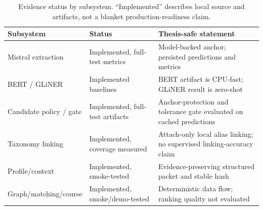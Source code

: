 \begin{table}[H]
\centering
\small
\caption{Evidence status by subsystem. ``Implemented'' describes local source and artifacts, not a blanket production-readiness claim.}
\label{tab:component-status}
\begin{tabularx}{\textwidth}{p{}p{}X}
\toprule
Subsystem & Status & Thesis-safe statement \\
\midrule
Mistral extraction & Implemented, full-test metrics & Model-backed anchor; persisted predictions and metrics \\
BERT / GLiNER & Implemented baselines & BERT artifact is CPU-fast; GLiNER result is zero-shot \\
Candidate policy / gate & Implemented, full-test artifacts & Anchor-protection and tolerance gate evaluated on cached predictions \\
Taxonomy linking & Implemented, coverage measured & Attach-only local alias linking; no supervised linking-accuracy claim \\
Profile/context & Implemented, smoke-tested & Evidence-preserving structured packet and stable hash \\
Graph/matching/course & Implemented, smoke/demo-tested & Deterministic data flow; ranking quality not evaluated \\
\bottomrule
\end{tabularx}
\end{table}
